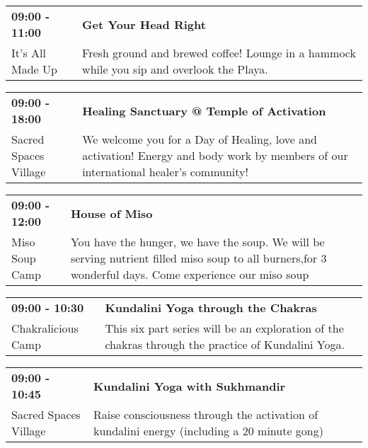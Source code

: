 \begin{tabular}{ p{1in} p{2.2in} }
    \textbf{09:00 - 11:00} & \textbf{Get Your Head Right} \\
    It's All Made Up \newline  & Fresh ground and brewed coffee! Lounge in a hammock while you sip and overlook the Playa. \\
    \hline 
\end{tabular}
    
\begin{tabular}{ p{1in} p{2.2in} }
    \textbf{09:00 - 18:00} & \textbf{Healing Sanctuary @ Temple of Activation} \\
    Sacred Spaces Village \newline  & We welcome you for a Day of Healing, love and activation! Energy and body work by members of our international healer's community! \\
    \hline 
\end{tabular}
    
\begin{tabular}{ p{1in} p{2.2in} }
    \textbf{09:00 - 12:00} & \textbf{House of Miso } \\
    Miso Soup Camp \newline  & You have the hunger, we have the soup. We will be serving nutrient filled miso soup to all burners,for 3 wonderful days. Come experience our miso soup \\
    \hline 
\end{tabular}
    
\begin{tabular}{ p{1in} p{2.2in} }
    \textbf{09:00 - 10:30} & \textbf{Kundalini Yoga through the Chakras} \\
    Chakralicious Camp \newline  & This six part series will be an exploration of the chakras through the practice of Kundalini Yoga. \\
    \hline 
\end{tabular}
    
\begin{tabular}{ p{1in} p{2.2in} }
    \textbf{09:00 - 10:45} & \textbf{Kundalini Yoga with Sukhmandir} \\
    Sacred Spaces Village \newline  & Raise consciousness through the activation of kundalini energy (including a 20 minute gong) \\
    \hline 
\end{tabular}
    
